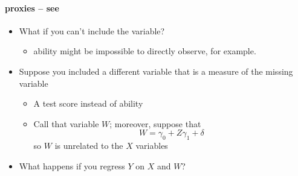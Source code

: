 \paragraph{proxies -- see \citet[Section 12.5]{Gre_2011}}
\begin{itemize}
\item What if you can't include the variable?
\begin{itemize}
\item ability might be impossible to directly observe, for
            example.
\end{itemize}
\item Suppose you included a different variable that is a measure
          of the missing variable
\begin{itemize}
\item A test score instead of ability
\item Call that variable $W$; moreover, suppose that
            \[W = \gamma_{0} + Z \gamma_{1} + \delta\]
            so $W$ is unrelated to the $X$ variables
\end{itemize}
\item What happens if you regress $Y$ on $X$ and $W$?
\end{itemize}
